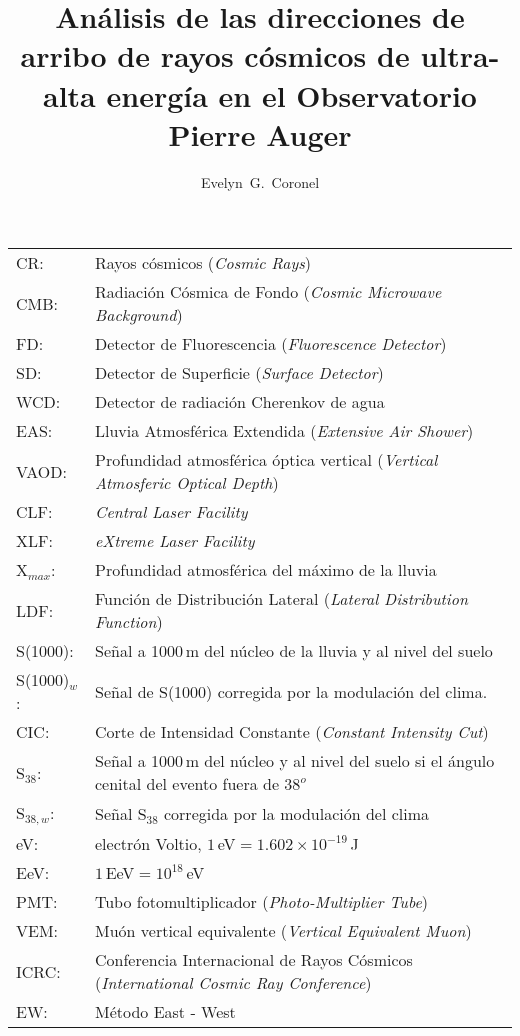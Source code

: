 \documentclass[12pt,papel,oneside]{ibtesis}
\title{Análisis de las direcciones de arribo de rayos cósmicos de ultra-alta energía en el Observatorio Pierre Auger}
\author{Evelyn~G.~Coronel}
\begin{document}
\begin{preliminary}


\begin{abreviaturas}

\begin{tabular}{l l}
CR: 		& Rayos cósmicos  (\emph{Cosmic Rays}) \\
CMB: 		& Radiación Cósmica de Fondo (\emph{Cosmic Microwave Background})\\
FD: 		& Detector de Fluorescencia (\emph{Fluorescence Detector}) \\
SD: 		& Detector de Superficie (\emph{Surface Detector})  \\
WCD: 		& Detector de radiación Cherenkov de agua\\
EAS: 		& Lluvia Atmosférica Extendida  (\emph{Extensive Air Shower})    \\
VAOD: 		& Profundidad atmosférica óptica vertical (\emph{Vertical Atmosferic Optical Depth})\\
CLF:		& \emph{Central Laser Facility}\\
XLF:		& \emph{eXtreme Laser Facility}\\
X$_{max}$: 	& Profundidad atmosférica del máximo de la lluvia \\
LDF: 		& Función de Distribución Lateral (\emph{Lateral Distribution Function}) \\
S(1000): 	& Señal a 1000\,m del núcleo de la lluvia y al nivel del suelo \\
S(1000)$_w$:& Señal de S(1000) corregida por la modulación del clima. \\
CIC: 		& Corte de Intensidad Constante (\emph{Constant Intensity Cut}) \\
S$_{38}$: 	& Señal a 1000\,m del núcleo y al nivel del suelo si el ángulo cenital del evento fuera de $38^o$\\
S$_{38,w}$: & Señal S$_{38}$ corregida por la modulación del clima \\
eV: 		& electrón Voltio, $1\,$eV$= 1.602\times 10^{-19}\,$J \\
EeV: 		& $1\,$EeV$=10^{18}\,$eV\\
PMT: 		& Tubo fotomultiplicador (\emph{Photo-Multiplier Tube})\\
VEM: 		& Muón vertical equivalente (\emph{Vertical Equivalent Muon})\\
ICRC: 		& Conferencia Internacional de Rayos Cósmicos (\emph{International Cosmic Ray Conference})\\
EW:			& Método East - West
\end{tabular}
\end{abreviaturas}

	\tableofcontents                %
	\listoffigures                  %

	

\end{preliminary}
\end{document}
